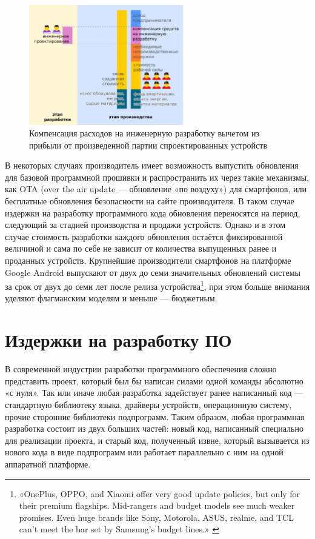 \documentclass{article}
\begin{document}
\begin{figure}[h]
    \centering
    \includegraphics[width=0.6\textwidth]{model-hard-soft}
    \caption{Компенсация расходов на инженерную разработку вычетом из прибыли от произведенной партии спроектированных устройств}
    \label{fig:model_hard_soft}
\end{figure}

В некоторых случаях производитель имеет возможность выпустить обновления для базовой программной прошивки и распространить их через такие механизмы, как OTA (over the air update — обновление «по воздуху») для смартфонов, или бесплатные обновления безопасности на сайте производителя. В таком случае издержки на разработку программного кода обновления переносятся на период, следующий за стадией производства и продажи устройств. Однако и в этом случае стоимость разработки каждого обновления остаётся фиксированной величиной и сама по себе не зависит от количества выпущенных ранее и проданных устройств. Крупнейшие производители смартфонов на платформе Google Android выпускают от двух до семи значительных обновлений системы за срок от двух до семи лет после релиза устройства\footnote{«OnePlus, OPPO, and Xiaomi offer very good update policies, but only for their premium flagships. Mid-rangers and budget models see much weaker promises. Even huge brands like Sony, Motorola, ASUS, realme, and TCL can’t meet the bar set by Samsung’s budget lines.» \cite{phoneUpdates}}, при этом больше внимания уделяют флагманским моделям и меньше — бюджетным.

\section*{Издержки на разработку ПО}

В современной индустрии разработки программного обеспечения сложно представить проект, который был бы написан силами одной команды абсолютно «с нуля». Так или иначе любая разработка задействует ранее написанный код — стандартную библиотеку языка, драйверы устройств, операционную систему, прочие сторонние библиотеки подпрограмм. Таким образом, любая программная разработка состоит из двух больших частей: новый код, написанный специально для реализации проекта, и старый код, полученный извне, который вызывается из нового кода в виде подпрограмм или работает параллельно с ним на одной аппаратной платформе.
\end{document}
